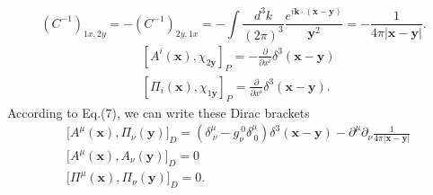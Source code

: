 \documentclass[12pt]{article}
\begin{document}
\begin{equation}
    (C^{-1})_{1x,2y}=-(C^{-1})_{2y, 1x}=-\int \frac{d^{3} k}{(2 \pi)^{3}}
    \frac{e^{i \mathbf{k} \cdot(\mathbf{x}-\mathbf{y})}}
    {\mathbf{y}^{2}}=-\frac{1}{4 \pi|\mathbf{x}-\mathbf{y}|}.
\end{equation}
\begin{equation}
    \begin{split}
        &[A^{i}(\boldsymbol{x}), \chi_{2 \boldsymbol{y}}]_{P}=-\frac{\partial}
        {\partial x^{i}} \delta^{3}(\boldsymbol{x}-\boldsymbol{y})\\
        &[\Pi_{i}(\boldsymbol{x}), \chi_{1 \boldsymbol{y}}]_{P}=
        \frac{\partial}{\partial x^{i}} \delta^{3}(\boldsymbol{x}-\boldsymbol{y}).
    \end{split}
\end{equation}
According to Eq.(7), we can write these Dirac brackets
\begin{equation}
    \begin{split}
        &\big[A^\mu(\mathbf{x}),\Pi_\nu(\mathbf{y})\big]_D=(\delta^\mu_{\ \nu}
        -g^{\ 0}_\nu\delta^\mu_{\ 0})\delta^3(\mathbf{x}-\mathbf{y})-
        \partial^\mu\partial_\nu\frac{1}{4\pi|\mathbf{x}-\mathbf{y}|}\\
        &\big[A^\mu(\mathbf{x}),A_\nu(\mathbf{y})\big]_D=0\\
        &\big[\Pi^\mu(\mathbf{x}),\Pi_\nu(\mathbf{y})\big]_D=0.
    \end{split}
\end{equation}
\end{document}
